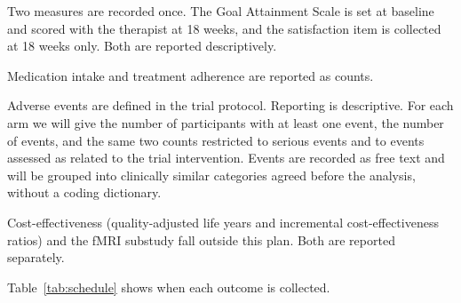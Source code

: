 \documentclass[11pt,a4paper]{article}
\begin{document}
Two measures are recorded once. The Goal Attainment Scale
\citep{turnerstokes2009} is set at baseline
and scored with the therapist at 18 weeks, and the satisfaction item is
collected at 18 weeks only. Both are reported
descriptively.

Medication intake and treatment adherence are reported as counts.

Adverse events are defined in the trial protocol. Reporting is descriptive.
For each arm we will give the number of participants with at least one event,
the number of events, and the same two counts restricted to serious events and
to events assessed as related to the trial intervention. Events are recorded as
free text and will be grouped into clinically similar categories agreed before
the analysis, without a coding dictionary.

Cost-effectiveness (quality-adjusted life years and incremental
cost-effectiveness ratios) and the fMRI substudy fall outside this plan. Both
are reported separately.

Table~\ref{tab:schedule} shows when each outcome is collected.
\end{document}

